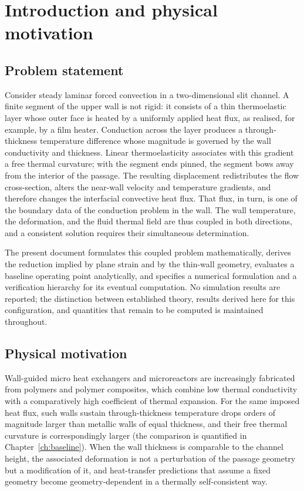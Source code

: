 \chapter{Introduction and physical motivation}
\label{ch:intro}

\section{Problem statement}
Consider steady laminar forced convection in a two-dimensional slit channel. A finite segment of the
upper wall is not rigid: it consists of a thin thermoelastic layer whose outer face is heated by a
uniformly applied heat flux, as realised, for example, by a film heater. Conduction across the layer
produces a through-thickness temperature difference whose magnitude is governed by the wall
conductivity and thickness. Linear thermoelasticity associates with this gradient a free thermal
curvature; with the segment ends pinned, the segment bows away from the interior of the passage. The
resulting displacement redistributes the flow cross-section, alters the near-wall velocity and
temperature gradients, and therefore changes the interfacial convective heat flux. That flux, in
turn, is one of the boundary data of the conduction problem in the wall. The wall temperature, the
deformation, and the fluid thermal field are thus coupled in both directions, and a consistent
solution requires their simultaneous determination.

The present document formulates this coupled problem mathematically, derives the reduction implied
by plane strain and by the thin-wall geometry, evaluates a baseline operating point analytically,
and specifies a numerical formulation and a verification hierarchy for its eventual computation. No
simulation results are reported; the distinction between established theory, results derived here
for this configuration, and quantities that remain to be computed is maintained throughout.

\section{Physical motivation}
Wall-guided micro heat exchangers and microreactors are increasingly fabricated from polymers and
polymer composites, which combine low thermal conductivity with a comparatively high coefficient of
thermal expansion. For the same imposed heat flux, such walls sustain through-thickness temperature
drops orders of magnitude larger than metallic walls of equal thickness, and their free thermal
curvature is correspondingly larger (the comparison is quantified in
Chapter~\ref{ch:baseline}). When the wall thickness is comparable to the channel height, the
associated deformation is not a perturbation of the passage geometry but a modification of it, and
heat-transfer predictions that assume a fixed geometry become geometry-dependent in a
thermally self-consistent way.

